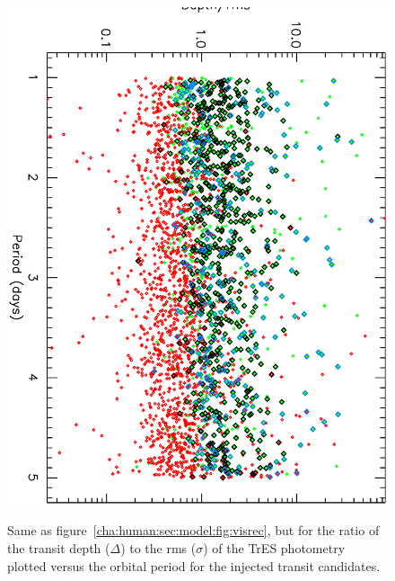 \begin{figure}
\begin{center}
\centering
\includegraphics[width=.75\textwidth, angle=90]{7_visual_c} \\
\caption[$\Delta/\sigma$ versus period for visually recovered transits]{%
Same as figure~\ref{cha:human:sec:model:fig:visrec}, but for the ratio of the transit depth ($\Delta$) to the rms ($\sigma$) of the TrES photometry plotted versus the orbital period for the injected transit candidates.%
}
\label{cha:human:sec:model:fig:visratiorec}
\end{center}
\end{figure}

